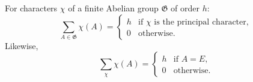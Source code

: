 For characters $\chi$ of a finite Abelian group $\mathfrak{G}$ of order $h$:
$$\sum_{A \in \mathfrak{G}} \chi(A) = \begin{cases}
h & \text{if } \chi \text{ is the principal character}, \\
0 & \text{otherwise}.
\end{cases}$$
Likewise,
$$\sum_{\chi} \chi(A) = \begin{cases}
h & \text{if } A = E, \\
0 & \text{otherwise}.
\end{cases}$$
